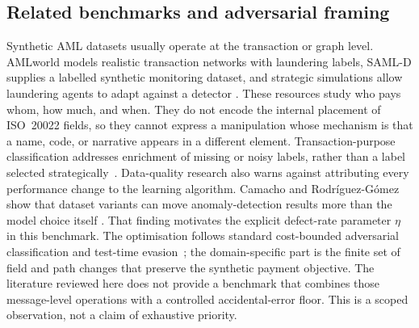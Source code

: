 \documentclass[conference]{IEEEtran}
\begin{document}
\subsection{Related benchmarks and adversarial framing}
Synthetic AML datasets usually operate at the transaction or graph level.
AMLworld models realistic transaction networks with laundering labels,
SAML-D supplies a labelled synthetic monitoring dataset, and strategic
simulations allow laundering agents to adapt against a detector
\cite{altman2023,oztas2023,wang2025}. These resources study who pays whom, how
much, and when. They do not encode the internal placement of ISO~20022 fields,
so they cannot express a manipulation whose mechanism is that a name, code, or
narrative appears in a different element. Transaction-purpose classification
addresses enrichment of missing or noisy labels, rather than a label selected
strategically~\cite{busson2023}.
Data-quality research also warns against attributing every performance change
to the learning algorithm. Camacho and Rodr\'iguez-G\'omez show that dataset
variants can move anomaly-detection results more than the model choice itself
\cite{camacho2025}. That finding motivates the explicit defect-rate parameter
$\eta$ in this benchmark. The optimisation follows standard cost-bounded
adversarial classification and test-time evasion~\cite{bruckner2011,biggio2013};
the domain-specific part is the finite set of field and path changes that
preserve the synthetic payment objective. The literature reviewed here does
not provide a benchmark that combines
those message-level operations with a controlled accidental-error floor. This
is a scoped observation, not a claim of exhaustive priority.
\end{document}
